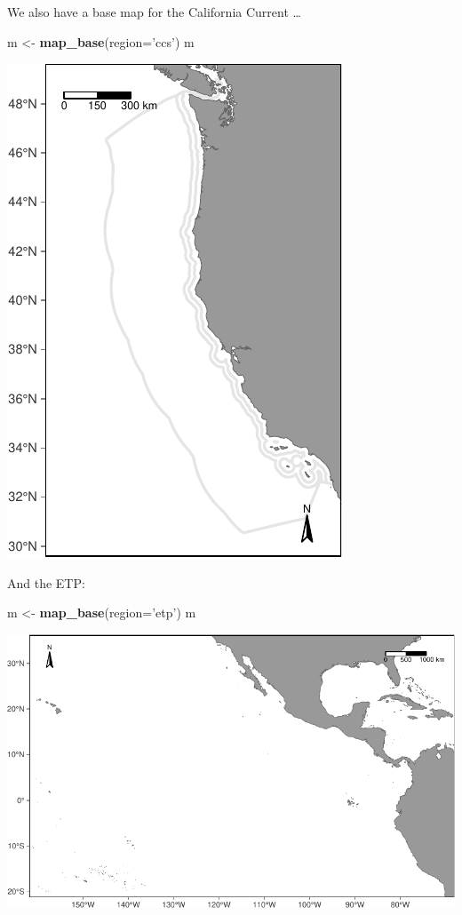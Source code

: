 \documentclass[
]{book}
\newenvironment{Shaded}{\begin{snugshade}}{\end{snugshade}}
\newcommand{\DataTypeTok}[1]{\textcolor[rgb]{0.13,0.29,0.53}{#1}}
\newcommand{\KeywordTok}[1]{\textcolor[rgb]{0.13,0.29,0.53}{\textbf{#1}}}
\newcommand{\NormalTok}[1]{#1}
\newcommand{\StringTok}[1]{\textcolor[rgb]{0.31,0.60,0.02}{#1}}
\begin{document}
We also have a base map for the California Current \ldots{}

\begin{Shaded}
\begin{Highlighting}[]
\NormalTok{m <-}\StringTok{ }\KeywordTok{map_base}\NormalTok{(}\DataTypeTok{region=}\StringTok{'ccs'}\NormalTok{)}
\NormalTok{m}
\end{Highlighting}
\end{Shaded}

\includegraphics{figures/unnamed-chunk-44-1.pdf}

And the ETP:

\begin{Shaded}
\begin{Highlighting}[]
\NormalTok{m <-}\StringTok{ }\KeywordTok{map_base}\NormalTok{(}\DataTypeTok{region=}\StringTok{'etp'}\NormalTok{)}
\NormalTok{m}
\end{Highlighting}
\end{Shaded}

\includegraphics{figures/unnamed-chunk-45-1.pdf}
\end{document}
